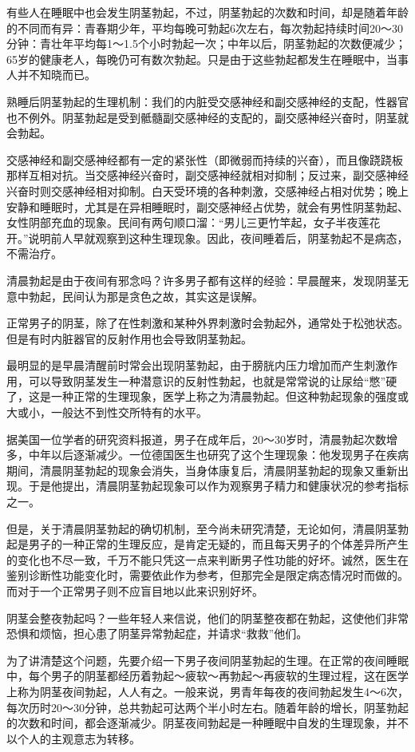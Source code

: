 \begin{enumerate}
有些人在睡眠中也会发生阴茎勃起，不过，阴茎勃起的次数和时间，却是随着年龄的不同而有异：青春期少年，平均每晚可勃起6次左右，每次勃起持续时间20～30分钟：青壮年平均每1～1.5个小时勃起一次；中年以后，阴茎勃起的次数便减少；65岁的健康老人，每晚仍可有数次勃起。只是由于这些勃起都发生在睡眠中，当事人并不知晓而已。

熟睡后阴茎勃起的生理机制：我们的内脏受交感神经和副交感神经的支配，性器官也不例外。阴茎勃起是受到骶髓副交感神经的支配的，副交感神经兴奋时，阴茎就会勃起。

交感神经和副交感神经都有一定的紧张性（即微弱而持续的兴奋），而且像跷跷板那样互相对抗。当交感神经兴奋时，副交感神经就相对抑制；反过来，副交感神经兴奋时则交感神经相对抑制。白天受环境的各种刺激，交感神经占相对优势；晚上安静和睡眠时，尤其是在异相睡眠时，副交感神经占优势，就会有男性阴茎勃起、女性阴部充血的现象。民间有两句顺口溜：“男儿三更竹竿起，女子半夜莲花开。”说明前人早就观察到这种生理现象。因此，夜间睡着后，阴茎勃起不是病态，不需治疗。

清晨勃起是由于夜间有邪念吗？许多男子都有这样的经验：早晨醒来，发现阴茎无意中勃起，民间认为那是贪色之故，其实这是误解。

正常男子的阴茎，除了在性刺激和某种外界刺激时会勃起外，通常处于松弛状态。但是有时内脏器官的反射作用也会导致阴茎勃起。

最明显的是早晨清醒前时常会出现阴茎勃起，由于膀胱内压力增加而产生刺激作用，可以导致阴茎发生一种潜意识的反射性勃起，也就是常常说的让尿给“憋”硬了，这是一种正常的生理现象，医学上称之为清晨勃起。但这种勃起现象的强度或大或小，一般达不到性交所特有的水平。

据美国一位学者的研究资料报道，男子在成年后，20～30岁时，清晨勃起次数增多，中年以后逐渐减少。一位德国医生也研究了这个生理现象：他发现男子在疾病期间，清晨阴茎勃起的现象会消失，当身体康复后，清晨阴茎勃起的现象又重新出现。于是他提出，清晨阴茎勃起现象可以作为观察男子精力和健康状况的参考指标之一。

但是，关于清晨阴茎勃起的确切机制，至今尚未研究清楚，无论如何，清晨阴茎勃起是男子的一种正常的生理反应，是肯定无疑的，而且每天男子的个体差异所产生的变化也不尽一致，千万不能只凭这一点来判断男子性功能的好坏。诚然，医生在鉴别诊断性功能变化时，需要依此作为参考，但那完全是限定病态情况时而做的。而对于一个正常男子则不应盲目地以此来识别好坏。

阴茎会整夜勃起吗？一些年轻人来信说，他们的阴茎整夜都在勃起，这使他们非常恐惧和烦恼，担心患了阴茎异常勃起症，并请求“救救”他们。

为了讲清楚这个问题，先要介绍一下男子夜间阴茎勃起的生理。在正常的夜间睡眠中，每个男子的阴茎都经历着勃起～疲软～再勃起～再疲软的生理过程，这在医学上称为阴茎夜间勃起，人人有之。一般来说，男青年每夜的夜间勃起发生4～6次，每次历时20～30分钟，总共勃起可达两个半小时左右。随着年龄的增长，阴茎勃起的次数和时间，都会逐渐减少。阴茎夜间勃起是一种睡眠中自发的生理现象，并不以个人的主观意志为转移。


\end{enumerate}
